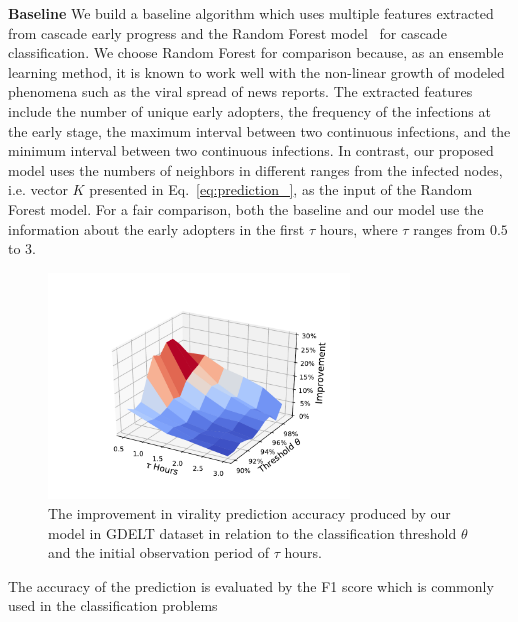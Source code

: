 \textbf{Baseline} We build a baseline algorithm which uses multiple features extracted from cascade early progress and the Random Forest model~\cite{liaw2002classification} for cascade classification. We choose Random Forest for comparison because, as an ensemble learning method, it is known to work well with the non-linear growth of modeled phenomena such as the viral spread of news reports. The extracted features include the number of unique early adopters, the frequency of the infections at the early stage, the maximum interval between two continuous infections, and the minimum interval between two continuous infections. In contrast, our proposed model uses the numbers of neighbors in different ranges from the infected nodes, i.e. vector $K$ presented in Eq.~\ref{eq:prediction_}, as the input of the Random Forest model. For a fair comparison, both the baseline and our model use the information about the early adopters in the first $\tau$ hours, where $\tau$ ranges from $0.5$ to $3$.

\begin{figure}
    \centering
    \hspace*{-1.5cm} 
    \includegraphics[width=8cm]{img/chap3/improvement3d.pdf}
    \caption{The improvement in virality prediction accuracy produced by our model in GDELT dataset in relation to the classification threshold $\theta$ and the initial observation period of $\tau$ hours.}
    \label{fig:improvement3d}
\end{figure}

The accuracy of the prediction is evaluated by the F1 score which is commonly used in the classification problems

